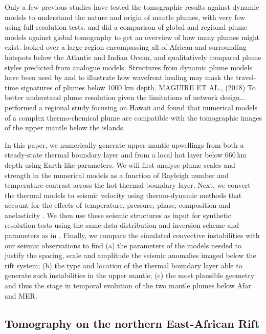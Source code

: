 \documentclass[a4paper,10pt,twocolumn]{paper}
\begin{document}
Only a few previous studies have tested the tomographic results against dynamic models to understand the nature and origin of mantle plumes, with very few using full resolution tests. \cite{boschi-etal-2007} and \cite{styles-etal-2011} did a comparison of global and regional plume models against global tomography to get an overview of how many plumes might exist. \cite{davaille-etal-2005} looked over a large region encompassing all of African and surrounding hotspots below the Atlantic and Indian Ocean, and qualitatively compared plume styles predicted from analogue models. Structures from dynamic plume models have been used by \cite{hwang-etal-2011} and \cite{maguire-etal-2016} to illustrate how wavefront healing may mask the travel-time signatures of plumes below 1000 km depth. MAGUIRE ET AL., (2018) To better understand plume resolution given the limitations of network design... \cite{ballmer-etal-2013} performed a regional study focusing on Hawaii and found that numerical models of a complex thermo-chemical plume are compatible with the tomographic images of the upper mantle below the islands.

In this paper, we numerically generate upper-mantle upwellings from both a steady-state thermal boundary layer and from a local hot layer below 660\,km depth using Earth-like parameters. We will first analyse plume scales and strength in the numerical models as a function of Rayleigh number and temperature contrast across the hot thermal boundary layer. Next, we convert the thermal models to seismic velocity using thermo-dynamic methods that account for the effects of temperature, pressure, phase, composition and anelasticity \citep{cobden-etal-2008,goes-etal-2004,styles-etal-2011b}. We then use these seismic structures as input for synthetic resolution tests using the same data distribution and inversion scheme and parameters as in \cite{civiero-etal-2015,civiero-etal-2016}. Finally, we compare the simulated convective instabilities with our seismic observations to find (a) the parameters of the models needed to justify the spacing, scale and amplitude the seismic anomalies imaged below the rift system; (b) the type and location of the thermal boundary layer able to generate such instabilities in the upper mantle; (c) the most plausible geometry and thus the stage in temporal evolution of the two mantle plumes below Afar and MER.

\subsection{Tomography on the northern East-African Rift}
\end{document}

